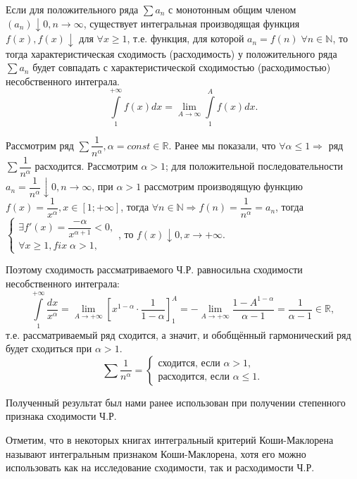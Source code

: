 \begin{theorem}
	Если для положительного ряда $\sum a_n$ с монотонным общим членом $\left(a_n\right) \downarrow 0, n \to \infty$, существует интегральная производящая функция $f(x), f(x) \downarrow$ для $\forall x \geqslant 1$, т.е. функция, для которой $a_n = f(n) \; \forall n \in \mathbb{N}$, то тогда характеристическая сходимость (расходимость) у положительного ряда $\sum a_n$ будет совпадать с характеристической сходимостью (расходимостью) несобственного интеграла.
	\begin{equation*}
	\int\limits_1^{+ \infty} f(x) dx = \lim\limits_{A \to \infty} \int\limits_1^{A} f(x) dx.
	\end{equation*}
\end{theorem}
\begin{example}
	Рассмотрим ряд $\sum \dfrac{1}{n^{\alpha}}, \alpha = const \in \mathbb{R}$. Ранее мы показали, что $\forall \alpha \leqslant 1 \Rightarrow$ ряд $\sum \dfrac{1}{n^{\alpha}}$ расходится. Рассмотрим $\alpha > 1$; для положительной последовательности $a_n = \dfrac{1}{n^{\alpha}} \downarrow 0, n \to \infty$, при $\alpha > 1$ рассмотрим производящую функцию $f(x) = \dfrac{1}{x^{\alpha}}, x \in [ 1; +\infty ]$, тогда $\forall n \in \mathbb{N} \Rightarrow f(n) = \dfrac{1}{n^{\alpha}} = a_n$, тогда $\begin{cases}
		\exists f'(x) = \dfrac{-\alpha}{x^{\alpha+1}} < 0,\\
		\forall x \geqslant 1, fix \; \alpha > 1,
	\end{cases}$, то $f(x) \downarrow 0, x \to +\infty$.
	
	Поэтому сходимость рассматриваемого Ч.Р. равносильна сходимости несобственного интеграла:
	\begin{equation*}
	\int\limits_1^{+ \infty} \dfrac{dx}{x^\alpha} = \lim\limits_{A \to +\infty} \left[x^{1-\alpha} \cdot \dfrac{1}{1-\alpha}\right]^A_1 = -\lim\limits_{A \to + \infty} \dfrac{1 - A^{1-\alpha}}{\alpha-1} = \dfrac{1}{\alpha - 1} \in \mathbb{R}, 
	\end{equation*}
	т.е. рассматриваемый ряд сходится, а значит, и обобщённый гармонический ряд будет сходиться при $\alpha > 1$.
	\begin{equation*}
	\sum \dfrac{1}{n^{\alpha}} = \begin{cases}
	\text{сходится, если } \alpha > 1, \\
	\text{расходится, если } \alpha \leqslant 1.
	\end{cases}
	\end{equation*}
	
	Полученный результат был нами ранее использован при получении степенного признака сходимости Ч.Р.
	
	Отметим, что в некоторых книгах интегральный критерий Коши-Маклорена называют интегральным признаком Коши-Маклорена, хотя его можно использовать как на исследование сходимости, так и расходимости Ч.Р.
\end{example}

